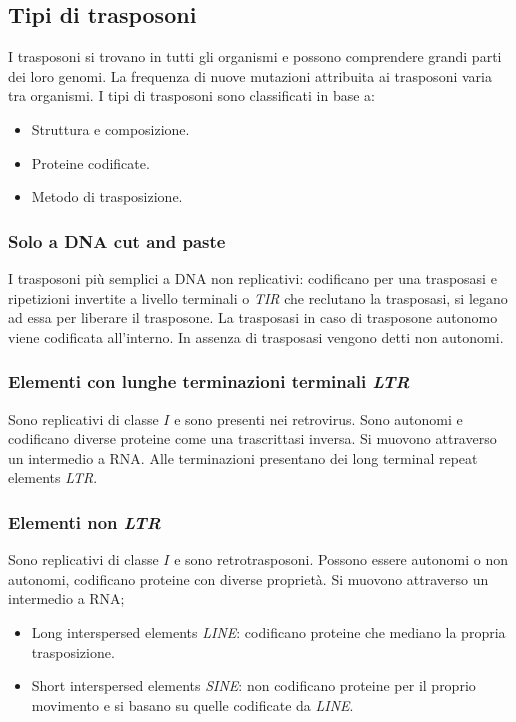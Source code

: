 	\subsection{Tipi di trasposoni}
	I trasposoni si trovano in tutti gli organismi e possono comprendere grandi parti dei loro genomi.
	La frequenza di nuove mutazioni attribuita ai trasposoni varia tra organismi.
	I tipi di trasposoni sono classificati in base a:
	\begin{itemize}
		\item Struttura e composizione.
		\item Proteine codificate.
		\item Metodo di trasposizione.
	\end{itemize}

		\subsubsection{Solo a DNA cut and paste}
		I trasposoni pi\`u semplici a DNA non replicativi: codificano per una trasposasi e ripetizioni invertite a livello terminali o \emph{TIR} che reclutano la trasposasi, si legano ad essa per
		liberare il trasposone.
		La trasposasi in caso di trasposone autonomo viene codificata all'interno.
		In assenza di trasposasi vengono detti non autonomi.

		\subsubsection{Elementi con lunghe terminazioni terminali \emph{LTR}}
		Sono replicativi di classe $I$ e sono presenti nei retrovirus.
		Sono autonomi e codificano diverse proteine come una trascrittasi inversa.
		Si muovono attraverso un intermedio a RNA.
		Alle terminazioni presentano dei long terminal repeat elements \emph{LTR}.

		\subsubsection{Elementi non \emph{LTR}}
		Sono replicativi di classe $I$ e sono retrotrasposoni.
		Possono essere autonomi o non autonomi, codificano proteine con diverse propriet\`a.
		Si muovono attraverso un intermedio a RNA;
		\begin{itemize}
			\item Long interspersed elements \emph{LINE}: codificano proteine che mediano la propria trasposizione.
			\item Short interspersed elements \emph{SINE}: non codificano proteine per il proprio movimento e si basano su quelle codificate da \emph{LINE}.
		\end{itemize}

